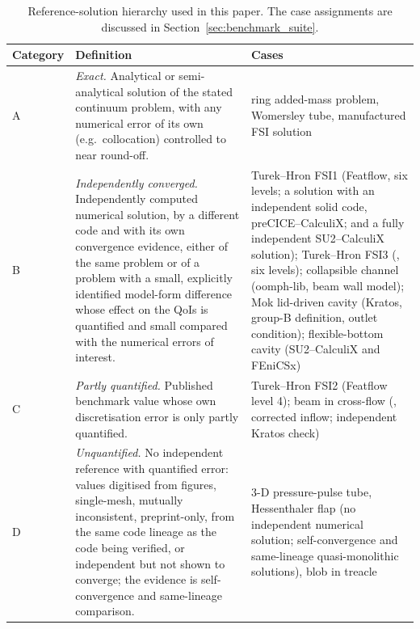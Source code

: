 \begin{table}[htbp]
	\centering
	\small
	\setlength{\tabcolsep}{4pt}
	\caption{Reference-solution hierarchy used in this paper. The case assignments are discussed in Section~\ref{sec:benchmark_suite}.}
	\label{tab:ref_hierarchy}
	\begin{tabular}{p{1.4cm}p{7.0cm}p{5.0cm}}
		\toprule
		Category & Definition & Cases \\
		\midrule
		A & \emph{Exact.} Analytical or semi-analytical solution of the stated continuum problem, with any numerical error of its own (e.g.\ collocation) controlled to near round-off. & ring added-mass problem, Womersley tube, manufactured FSI solution \\
		B & \emph{Independently converged.} Independently computed numerical solution, by a different code and with its own convergence evidence, either of the same problem or of a problem with a small, explicitly identified model-form difference whose effect on the QoIs is quantified and small compared with the numerical errors of interest. & Turek--Hron FSI1 (Featflow, six levels; a solution with an independent solid code, preCICE--CalculiX; and a fully independent SU2--CalculiX solution); Turek--Hron FSI3 (\citet{Failer2020}, six levels); collapsible channel (oomph-lib, beam wall model); Mok lid-driven cavity (Kratos, group-B definition, outlet condition); flexible-bottom cavity (SU2--CalculiX and FEniCSx) \\
		C & \emph{Partly quantified.} Published benchmark value whose own discretisation error is only partly quantified. & Turek--Hron FSI2 (Featflow level 4); beam in cross-flow (\citet{Richter2012}, corrected inflow; independent Kratos check) \\
		D & \emph{Unquantified.} No independent reference with quantified error: values digitised from figures, single-mesh, mutually inconsistent, preprint-only, from the same code lineage as the code being verified, or independent but not shown to converge; the evidence is self-convergence and same-lineage comparison. & 3-D pressure-pulse tube, Hessenthaler flap (no independent numerical solution; self-convergence and same-lineage quasi-monolithic solutions), blob in treacle \\
		\bottomrule
	\end{tabular}
\end{table}

